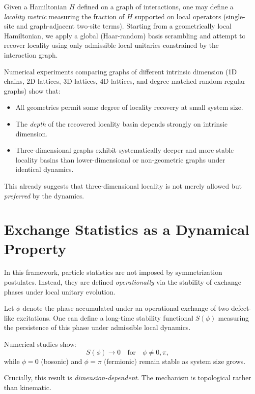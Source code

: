 \documentclass[11pt]{article}
\begin{document}
Given a Hamiltonian $H$ defined on a graph of interactions, one may define a \emph{locality metric} measuring the fraction of $H$ supported on local operators (single-site and graph-adjacent two-site terms). Starting from a geometrically local Hamiltonian, we apply a global (Haar-random) basis scrambling and attempt to recover locality using only admissible local unitaries constrained by the interaction graph.

Numerical experiments comparing graphs of different intrinsic dimension (1D chains, 2D lattices, 3D lattices, 4D lattices, and degree-matched random regular graphs) show that:
\begin{itemize}
    \item All geometries permit some degree of locality recovery at small system size.
    \item The \emph{depth} of the recovered locality basin depends strongly on intrinsic dimension.
    \item Three-dimensional graphs exhibit systematically deeper and more stable locality basins than lower-dimensional or non-geometric graphs under identical dynamics.
\end{itemize}

This already suggests that three-dimensional locality is not merely allowed but \emph{preferred} by the dynamics.

\section{Exchange Statistics as a Dynamical Property}

In this framework, particle statistics are not imposed by symmetrization postulates. Instead, they are defined \emph{operationally} via the stability of exchange phases under local unitary evolution.

Let $\phi$ denote the phase accumulated under an operational exchange of two defect-like excitations. One can define a long-time stability functional $S(\phi)$ measuring the persistence of this phase under admissible local dynamics.

Numerical studies show:
\begin{equation}
S(\phi) \to 0 \quad \text{for} \quad \phi \neq 0,\pi,
\end{equation}
while $\phi = 0$ (bosonic) and $\phi = \pi$ (fermionic) remain stable as system size grows.

Crucially, this result is \emph{dimension-dependent}. The mechanism is topological rather than kinematic.
\end{document}
